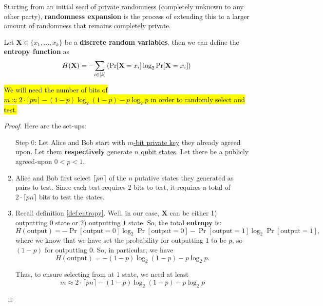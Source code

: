 \documentclass[12pt]{article}
\begin{document}
\begin{definition}
Starting from an initial seed of \underline{private} \underline{randomness} (completely unknown to any other party), \textbf{randomness expansion} is the process of extending this to a larger amount of randomness that remains completely private.
\end{definition}

\begin{definition}\label{def:entropy}
Let $\mathbf{X} \in \{x_1, \ldots, x_k\}$ be a \textbf{discrete random variables}, then we can define the \textbf{entropy function} as $$
    H(\mathbf{X}) = -\underset{i\in [k]}{\sum}\left(\Pr[\mathbf{X} = x_i]\log_2\Pr[\mathbf{X} = x_i]\right)
    $$
\end{definition}

\begin{theorem}
\hl{We will need the number of bits of $m \approx 2\cdot \lceil pn \rceil - (1-p)\log_2(1-p) - p\log_2p$ in order to randomly select and test.}
\end{theorem}
\begin{proof}
Here are the set-ups:
\begin{enumerate}[Step 1:]
    \item[Step 0:] Let Alice and Bob start with \underline{$m$-bit private key} they already agreed upon. Let them \textbf{respectively} generate \underline{$n$ qubit states}. Let there be a publicly agreed-upon \underline{$0< p < 1$}.
    \item Alice and Bob first select $\lceil pn \rceil$ of the $n$ putative states they generated as pairs to test. Since each test requires $2$ bits to test, it requires a total of $\boxed{2\cdot \lceil pn \rceil}$ bits to test the states.
    \item Recall definition \ref{def:entropy}. Well, in our case, $\mathbf{X}$ can be either 1) outputting $0$ state or 2) outputting $1$ state. So, the total \textbf{entropy} is: $$
    H(\text{output}) = -\Pr[\text{output} = 0]\log_2\Pr[\text{output} = 0]-\Pr[\text{output} = 1]\log_2\Pr[\text{output} = 1],
    $$ where we know that we have set the probability for outputting $1$ to be $p$, so $(1-p)$ for outputting $0$. So, in particular, we have $$
    H(\text{output}) = \boxed{-(1-p)\log_2(1-p)-p\log_2p}.
    $$

    Thus, to ensure selecting from at $1$ state, we need at least $$
    \boxed{m \approx 2\cdot \lceil pn \rceil - (1-p)\log_2(1-p) - p\log_2p}
    $$
\end{enumerate}
\end{proof}
\end{document}
